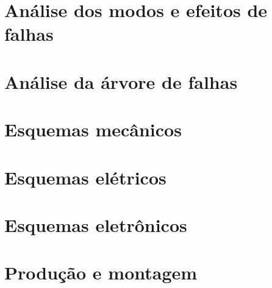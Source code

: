 \section{Análise dos modos e efeitos de falhas}
\label{sec:hwfmeca}

\section{Análise da árvore de falhas}
\label{sec:hwfta}

\section{Esquemas mecânicos}
\label{sec:esqmec}

\section{Esquemas elétricos}
\label{sec:esqelet}

\section{Esquemas eletrônicos}
\label{sec:esqele}

\section{Produção e montagem}
\label{sec:prodmont}


